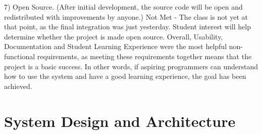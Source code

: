\documentclass[a4paper]{article}
\begin{document}
7) Open Source.  (After initial development, the source code will be open and redistributed with improvements by anyone.) Not Met - The class is not yet at that point, as the final integration was just yesterday.  Student interest will help determine whether the project is made open source. \newline \newline 
Overall, Usability, Documentation and Student Learning Experience were the most helpful non-functional requirements, as meeting these requirements together means that the project is a basic success.  In other words, if aspiring programmers can understand how to use the system and have a good learning experience, the goal has been achieved.  



\section{System Design and Architecture}
\end{document}
